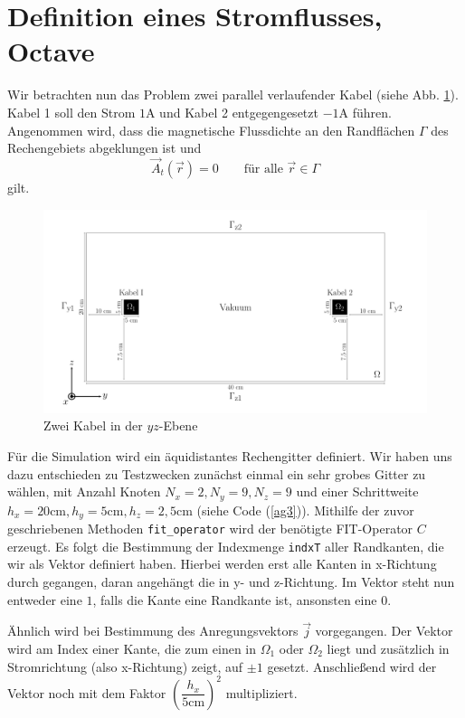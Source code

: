 \section{Definition eines Stromflusses, Octave}
Wir betrachten nun das Problem zwei parallel verlaufender Kabel (siehe Abb. \ref{fig:problem}). Kabel 1 soll den Strom $1 \si{\ampere}$ und Kabel 2 entgegengesetzt $-1\si{\ampere}$ führen. Angenommen wird, dass die magnetische Flussdichte an den Randflächen $\Gamma$ des Rechengebiets abgeklungen ist und 
\begin{equation}
\label{rand}
\vec{A}_t(\vec{r}) = 0 \qquad \text{für alle } \vec{r} \in \Gamma
\end{equation}
gilt.

\begin{figure}[thbp]
	\centering
	\includegraphics[width=.75\textwidth]{data/Problem}
	\caption{Zwei Kabel in der $yz$-Ebene}
	\label{fig:problem}
\end{figure}

Für die Simulation wird ein äquidistantes Rechengitter definiert. Wir haben uns dazu entschieden zu Testzwecken zunächst einmal ein sehr grobes Gitter zu wählen, mit Anzahl Knoten $N_x=2, N_y=9, N_z=9$ und einer Schrittweite $h_x=20\si{\centi\meter},h_y=5\si{\centi\meter},h_z=2,5\si{\centi\meter}$ (siehe Code (\ref{ag3})). Mithilfe der zuvor geschriebenen Methoden \texttt{fit\_operator} wird der benötigte FIT-Operator $C$ erzeugt. Es folgt die Bestimmung der Indexmenge \texttt{indxT} aller Randkanten, die wir als Vektor definiert haben. Hierbei werden erst alle Kanten in x-Richtung durch gegangen, daran angehängt die in y- und z-Richtung. Im Vektor steht nun entweder eine $1$, falls die Kante eine Randkante ist, ansonsten eine $0$.

Ähnlich wird bei Bestimmung des Anregungsvektors $\vec{j}$ vorgegangen. Der Vektor wird am Index einer Kante, die zum einen in $\Omega_1$ oder $\Omega_2$ liegt und zusätzlich in Stromrichtung (also x-Richtung) zeigt, auf $\pm1$ gesetzt. Anschließend wird der Vektor noch mit dem Faktor $\left(\dfrac{h_x}{5\si{\centi\meter}}\right)^2$ multipliziert.

